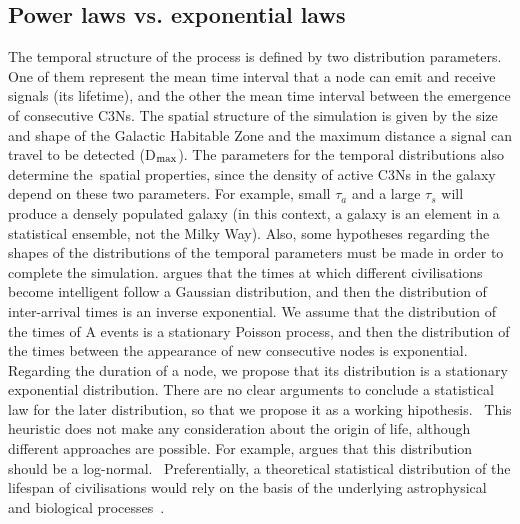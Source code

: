 \documentclass[crop]{CSLB}
\newcommand{\cetis}{C3Ns}
\begin{document}
    

\subsection{Power laws vs. exponential laws}\label{SS_PDF_shape}

The temporal structure of the process is defined by two distribution
parameters. One of them represent the mean time interval that a node can
emit and receive signals (its lifetime), and the other the mean time interval between the
emergence of consecutive \cetis{}.
%
The spatial structure of the simulation is
given by the size and shape of the Galactic Habitable Zone and the maximum
distance a signal can travel to be detected (D$_{\rm max}$). The parameters for
the temporal distributions also determine the spatial properties, since the
density of active \cetis{} in the galaxy depend on these two parameters. For
example, small $\tau_a$ and a large $\tau_s$ will produce a densely
populated galaxy (in this context, a galaxy is an element in a 
statistical ensemble, not the Milky Way).
%
Also, some hypotheses regarding the shapes of the
distributions of the temporal parameters must be made in order to complete the
simulation. \citet{forgan_spatiotemporal_2011} argues that the times at which
different civilisations become intelligent follow a Gaussian distribution, and
then the distribution of inter-arrival times is an inverse exponential. We
assume that the distribution of the times of A events is a stationary Poisson
process, and then the distribution of the times between the appearance of new
consecutive nodes is exponential. Regarding the duration of a node, we
propose that its distribution is a stationary
exponential distribution.  There are no clear arguments to conclude a
statistical law for the later distribution, so that we propose it as a working
hipothesis.  
%
This heuristic does not make any consideration about the origin of life, although
different approaches are possible.
%
For example,
\citet{maccone_lognormals_2014} argues that this distribution should be a log-normal. 
%
Preferentially, a theoretical statistical distribution of the lifespan of
civilisations would rely on the basis of the underlying
astrophysical and biological processes \citep{balbi_impact_2018}. 
\end{document}

